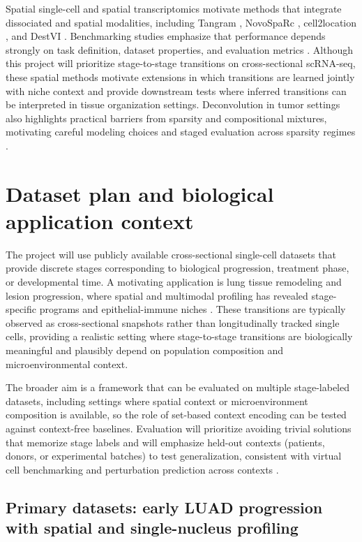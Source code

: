 \documentclass[conference]{IEEEtran}
\begin{document}
Spatial single-cell and spatial transcriptomics motivate methods that integrate dissociated and spatial modalities, including Tangram \cite{Biancalani2021-bt}, NovoSpaRc \cite{Moriel2021-wu}, cell2location \cite{Kleshchevnikov2022-ki}, and DestVI \cite{Lopez2022-ps}. Benchmarking studies emphasize that performance depends strongly on task definition, dataset properties, and evaluation metrics \cite{Li2022-uy}. Although this project will prioritize stage-to-stage transitions on cross-sectional scRNA-seq, these spatial methods motivate extensions in which transitions are learned jointly with niche context and provide downstream tests where inferred transitions can be interpreted in tissue organization settings. Deconvolution in tumor settings also highlights practical barriers from sparsity and compositional mixtures, motivating careful modeling choices and staged evaluation across sparsity regimes \cite{Montierth2025-ap}.

\section{Dataset plan and biological application context}

The project will use publicly available cross-sectional single-cell datasets that provide discrete stages corresponding to biological progression, treatment phase, or developmental time. A motivating application is lung tissue remodeling and lesion progression, where spatial and multimodal profiling has revealed stage-specific programs and epithelial-immune niches \cite{Peng2025-xu}. These transitions are typically observed as cross-sectional snapshots rather than longitudinally tracked single cells, providing a realistic setting where stage-to-stage transitions are biologically meaningful and plausibly depend on population composition and microenvironmental context.

The broader aim is a framework that can be evaluated on multiple stage-labeled datasets, including settings where spatial context or microenvironment composition is available, so the role of set-based context encoding can be tested against context-free baselines. Evaluation will prioritize avoiding trivial solutions that memorize stage labels and will emphasize held-out contexts (patients, donors, or experimental batches) to test generalization, consistent with virtual cell benchmarking \cite{Roohani2025-yb} and perturbation prediction across contexts \cite{Adduri2025-nt}.

\subsection{Primary datasets: early LUAD progression with spatial and single-nucleus profiling}
\end{document}
